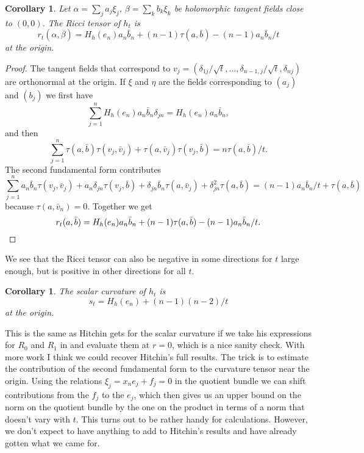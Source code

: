 \documentclass[10pt,a4paper]{amsart}
\newtheorem{coro}[theo]{Corollary}
\def\ton{a}
\def\ttw{b}
\def\ov#1{\overline{#1}}
\begin{document}
\begin{coro}
Let
$\alpha = \sum_j \ton_j \xi_j$,
$\beta = \sum_k \ttw_k \xi_k$
be holomorphic tangent fields close to $(0,0)$.
The Ricci tensor of $h_t$ is
$$
r_t(\alpha, \ov\beta)
= H_h(e_n) \ton_n \bar \ttw_n
+ (n-1) \tau(\ton, \bar \ttw)
- (n-1) \ton_n \bar \ttw_n / t
$$
at the origin.
\end{coro}

\begin{proof}
The tangent fields that correspond to
$v_j = (\delta_{1j}/\sqrt t, \ldots, \delta_{n-1,j}/\sqrt t, \delta_{nj})$ are
orthonormal at the origin.
If $\xi$ and $\eta$ are the fields corresponding to $(\ton_j)$ and $(\ttw_j)$ we
first have
$$
\sum_{j=1}^n H_h(e_n) \ton_n \bar \ttw_n \delta_{jn} = H_h(e_n) \ton_n \bar \ttw_n,
$$
and then
$$
\sum_{j=1}^n
\tau(\ton, \bar \ttw) \tau(v_j, \bar v_j) + \tau(\ton, \bar v_j) \tau(v_j, \bar \ttw)
= n \tau(\ton, \bar \ttw) / t.
$$
The second fundamental form contributes
$$
\sum_{j=1}^n
\ton_n \bar \ttw_n \tau(v_j, \bar v_j)
+ \ton_n \delta_{jn} \tau(v_j, \bar \ttw)
+ \delta_{jn} \bar \ttw_n \tau(\ton, \bar v_j)
+ \delta_{jn}^2 \tau(\ton, \bar \ttw)
= (n-1) \ton_n \bar \ttw_n / t + \tau(\ton, \bar \ttw)
$$
because $\tau(\ton, \bar v_n) = 0$.
Together we get
\[
r_t(\ton, \bar \ttw)
= H_h(e_n) \ton_n \bar \ttw_n
+ (n-1) \tau(\ton, \bar \ttw)
- (n-1) \ton_n \bar \ttw_n / t.
\qedhere
\]
\end{proof}

We see that the Ricci tensor can also be negative in some directions for $t$
large enough, but is positive in other directions for all $t$.


\begin{coro}
The scalar curvature of $h_t$ is
$$
s_t
= H_h(e_n)
+ (n-1)(n-2) / t
$$
at the origin.
\end{coro}

This is the same as Hitchin gets for the scalar curvature if we take his
expressions for $R_0$ and $R_1$ in \cite[Lemmas~5.15 and
5.16]{hitchin1975curvature} and evaluate them at $r = 0$, which is
a nice sanity check.
With more work I think we could recover Hitchin's full results.
The trick is to estimate the contribution of the second fundamental form
to the curvature tensor near the origin.
Using the relations $\xi_j = x_n e_j + f_j = 0$ in the quotient bundle we can
shift contributions from the $f_j$ to the $e_j$, which then gives us an upper
bound on the norm on the quotient bundle by the one on the product in terms
of a norm that doesn't vary with $t$.
This turns out to be rather handy for calculations.
However, we don't expect to have anything to add to Hitchin's results and
have already gotten what we came for.






\end{document}
